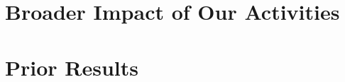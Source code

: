 \documentclass[12pt]{amsart}
\begin{document}
\section{Broader Impact of Our Activities}
\label{sec:broader_impacts}
\section{Prior Results}
 


\clearpage
%
%
%
%
\end{document}
